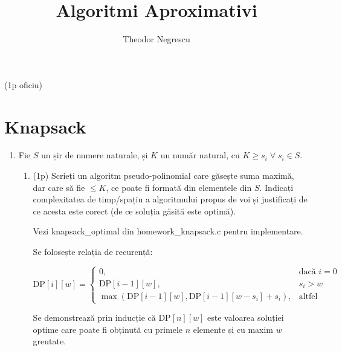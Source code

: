 \documentclass[a4paper,12pt]{article}
\title{Algoritmi Aproximativi}
\author{Theodor Negrescu}
\date{}
\newcommand*{\DP}{\text{DP}}
\begin{document}
\maketitle

(1p oficiu)

\section{Knapsack}

\begin{enumerate}

      \item
            Fie $S$ un șir de numere naturale, și $K$ un număr natural, cu $K \geq s_i \;\forall\; s_i \in S$.

            \begin{enumerate}

                  \item (1p)
                        Scrieți un algoritm pseudo-polinomial care găsește suma maximă,
                        dar care să fie $\leq K$, ce poate fi formată din elementele din $S$.
                        Indicați complexitatea de timp/spațiu a algoritmului propus de voi și justificați de ce
                        acesta este corect (de ce soluția găsită este optimă).

                        Vezi knapsack\_optimal din homework\_knapsack.c pentru implementare.

                        Se folosește relația de recurență:

                        \[
                              \DP[i][w] =
                              \begin{cases}
                                    0,                                              & \text{dacă } i = 0 \\
                                    \DP[i - 1][w],                                  & s_i > w            \\
                                    \max(\DP[i - 1][w], \DP[i - 1][w - s_i] + s_i), & \text{altfel}
                              \end{cases}
                        \]

                        Se demonstrează prin inducție că $\DP[n][w]$ este valoarea soluției optime
                        care poate fi obținută cu primele $n$ elemente și cu maxim $w$ greutate.

                        \begin{itemize}


\end{itemize}
\end{enumerate}
\end{enumerate}
\end{document}

